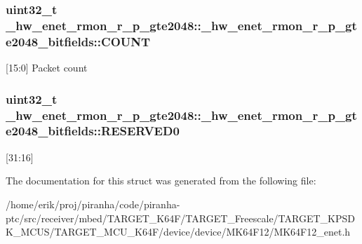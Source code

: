 \subsubsection[{\texorpdfstring{C\+O\+U\+NT}{COUNT}}]{\setlength{\rightskip}{0pt plus 5cm}uint32\+\_\+t \+\_\+hw\+\_\+enet\+\_\+rmon\+\_\+r\+\_\+p\+\_\+gte2048\+::\+\_\+hw\+\_\+enet\+\_\+rmon\+\_\+r\+\_\+p\+\_\+gte2048\+\_\+bitfields\+::\+C\+O\+U\+NT}\hypertarget{struct__hw__enet__rmon__r__p__gte2048_1_1__hw__enet__rmon__r__p__gte2048__bitfields_a5b61af25db1480d35f87bea72d5d43bb}{}\label{struct__hw__enet__rmon__r__p__gte2048_1_1__hw__enet__rmon__r__p__gte2048__bitfields_a5b61af25db1480d35f87bea72d5d43bb}
\mbox{[}15\+:0\mbox{]} Packet count 
\subsubsection[{\texorpdfstring{R\+E\+S\+E\+R\+V\+E\+D0}{RESERVED0}}]{\setlength{\rightskip}{0pt plus 5cm}uint32\+\_\+t \+\_\+hw\+\_\+enet\+\_\+rmon\+\_\+r\+\_\+p\+\_\+gte2048\+::\+\_\+hw\+\_\+enet\+\_\+rmon\+\_\+r\+\_\+p\+\_\+gte2048\+\_\+bitfields\+::\+R\+E\+S\+E\+R\+V\+E\+D0}\hypertarget{struct__hw__enet__rmon__r__p__gte2048_1_1__hw__enet__rmon__r__p__gte2048__bitfields_acae60dd6ab1c9305d1f87dd221a476d9}{}\label{struct__hw__enet__rmon__r__p__gte2048_1_1__hw__enet__rmon__r__p__gte2048__bitfields_acae60dd6ab1c9305d1f87dd221a476d9}
\mbox{[}31\+:16\mbox{]} 

The documentation for this struct was generated from the following file\+:\begin{DoxyCompactItemize}
\item 
/home/erik/proj/piranha/code/piranha-\/ptc/src/receiver/mbed/\+T\+A\+R\+G\+E\+T\+\_\+\+K64\+F/\+T\+A\+R\+G\+E\+T\+\_\+\+Freescale/\+T\+A\+R\+G\+E\+T\+\_\+\+K\+P\+S\+D\+K\+\_\+\+M\+C\+U\+S/\+T\+A\+R\+G\+E\+T\+\_\+\+M\+C\+U\+\_\+\+K64\+F/device/device/\+M\+K64\+F12/M\+K64\+F12\+\_\+enet.\+h\end{DoxyCompactItemize}
